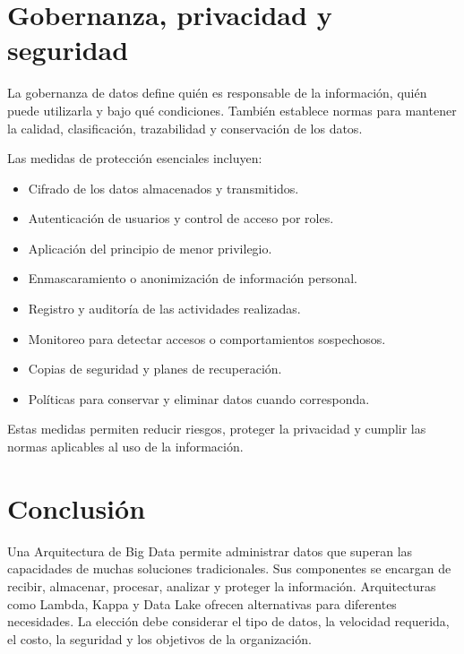 \section{Gobernanza, privacidad y seguridad}

La gobernanza de datos define quién es responsable de la información, quién
puede utilizarla y bajo qué condiciones. También establece normas para
mantener la calidad, clasificación, trazabilidad y conservación de los datos.

Las medidas de protección esenciales incluyen:

\begin{itemize}
    \item Cifrado de los datos almacenados y transmitidos.
    \item Autenticación de usuarios y control de acceso por roles.
    \item Aplicación del principio de menor privilegio.
    \item Enmascaramiento o anonimización de información personal.
    \item Registro y auditoría de las actividades realizadas.
    \item Monitoreo para detectar accesos o comportamientos sospechosos.
    \item Copias de seguridad y planes de recuperación.
    \item Políticas para conservar y eliminar datos cuando corresponda.
\end{itemize}

Estas medidas permiten reducir riesgos, proteger la privacidad y cumplir las
normas aplicables al uso de la información.

\section{Conclusión}

Una Arquitectura de Big Data permite administrar datos que superan las
capacidades de muchas soluciones tradicionales. Sus componentes se encargan
de recibir, almacenar, procesar, analizar y proteger la información.
Arquitecturas como Lambda, Kappa y Data Lake ofrecen alternativas para
diferentes necesidades. La elección debe considerar el tipo de datos, la
velocidad requerida, el costo, la seguridad y los objetivos de la
organización.
